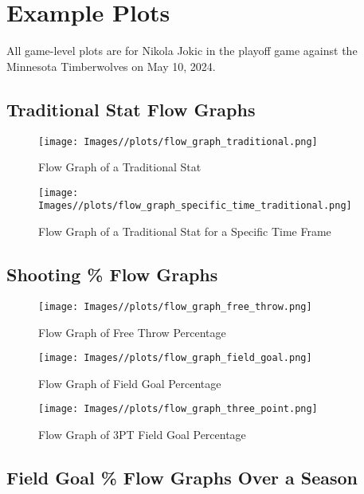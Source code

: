 \documentclass{article}
\begin{document}
\section{Example Plots}
All game-level plots are for Nikola Jokic in the playoff game against the Minnesota Timberwolves on May 10, 2024.

\subsection{Traditional Stat Flow Graphs}

\begin{figure}[H]
    \centering
    \texttt{[image: Images//plots/flow\_graph\_traditional.png]}
    \caption{Flow Graph of a Traditional Stat}
    \label{fig:1}
\end{figure}

\begin{figure}[H]
    \centering
    \texttt{[image: Images//plots/flow\_graph\_specific\_time\_traditional.png]}
    \caption{Flow Graph of a Traditional Stat for a Specific Time Frame}
    \label{fig:2}
\end{figure}

\subsection{Shooting \% Flow Graphs}
\begin{figure}[H]
    \centering
    \texttt{[image: Images//plots/flow\_graph\_free\_throw.png]}
    \caption{Flow Graph of Free Throw Percentage}
    \label{fig:3}
\end{figure}

\begin{figure}[H]
    \centering
    \texttt{[image: Images//plots/flow\_graph\_field\_goal.png]}
    \caption{Flow Graph of Field Goal Percentage}
    \label{fig:4}
\end{figure}

\begin{figure}[H]
    \centering
    \texttt{[image: Images//plots/flow\_graph\_three\_point.png]}
    \caption{Flow Graph of 3PT Field Goal Percentage}
    \label{fig:5}
\end{figure}

\subsection{Field Goal \% Flow Graphs Over a Season}
\end{document}
